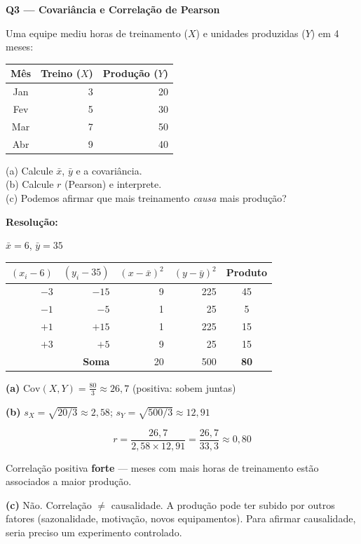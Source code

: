 \begin{SolvedBox}
\textbf{Q3 — Covariância e Correlação de Pearson}

Uma equipe mediu horas de treinamento ($X$) e unidades produzidas ($Y$)
em 4 meses:

\begin{center}
\begin{tabular}{|c|r|r|}
\hline
\textbf{Mês} & \textbf{Treino ($X$)} & \textbf{Produção ($Y$)} \\
\hline
Jan & 3 & 20 \\
Fev & 5 & 30 \\
Mar & 7 & 50 \\
Abr & 9 & 40 \\
\hline
\end{tabular}
\end{center}

(a) Calcule $\bar{x}$, $\bar{y}$ e a covariância.\\
(b) Calcule $r$ (Pearson) e interprete.\\
(c) Podemos afirmar que mais treinamento \emph{causa} mais produção?

\textbf{Resolução:}

$\bar{x} = 6$, \quad $\bar{y} = 35$

\begin{center}
\begin{tabular}{|r|r|r|r|c|}
\hline
$(x_i{-}6)$ & $(y_i{-}35)$ & $(x{-}\bar{x})^2$ & $(y{-}\bar{y})^2$ & Produto \\
\hline
$-3$ & $-15$ & 9 & 225 & 45 \\
$-1$ & $-5$  & 1 & 25  & 5  \\
$+1$ & $+15$ & 1 & 225 & 15 \\
$+3$ & $+5$  & 9 & 25  & 15 \\
\hline
\multicolumn{2}{|r|}{\textbf{Soma}} & 20 & 500 & \textbf{80} \\
\hline
\end{tabular}
\end{center}

\textbf{(a)} $\text{Cov}(X,Y) = \frac{80}{3} \approx 26{,}7$ (positiva: sobem juntas)

\textbf{(b)} $s_X = \sqrt{20/3} \approx 2{,}58$; \quad
$s_Y = \sqrt{500/3} \approx 12{,}91$

\[
r = \frac{26{,}7}{2{,}58 \times 12{,}91} = \frac{26{,}7}{33{,}3} \approx 0{,}80
\]

Correlação positiva \textbf{forte} — meses com mais horas de treinamento
estão associados a maior produção.

\textbf{(c)} Não. Correlação $\neq$ causalidade. A produção pode ter subido
por outros fatores (sazonalidade, motivação, novos equipamentos). Para
afirmar causalidade, seria preciso um experimento controlado.
\end{SolvedBox}


